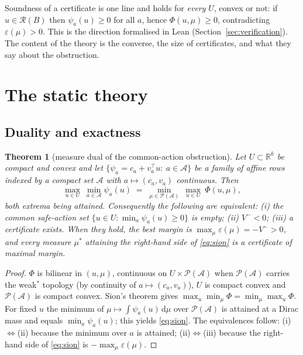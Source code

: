 \documentclass[11pt,a4paper]{article}
\theoremstyle{plain}
\newtheorem{theorem}{Theorem}[section]
\theoremstyle{definition}
\theoremstyle{remark}
\newcommand{\R}{\mathbb{R}}
\newcommand{\calA}{\mathcal{A}}
\newcommand{\calP}{\mathcal{P}}
\newcommand{\calR}{\mathcal{R}}
\newcommand{\dd}{\,\mathrm{d}}
\begin{document}
Soundness of a certificate is one line and holds for \emph{every} $U$, convex or not: if $u\in\calR(B)$ then $\psi_a(u)\ge0$ for all $a$, hence $\Phi(u,\mu)\ge0$, contradicting $\varepsilon(\mu)>0$. This is the direction formalised in Lean (Section~\ref{sec:verification}). The content of the theory is the converse, the size of certificates, and what they say about the obstruction.
\section{The static theory}\label{sec:static}

\subsection{Duality and exactness}

\begin{theorem}[measure dual of the common-action obstruction]\label{thm:dual}
Let $U\subset\R^k$ be compact and convex and let $\{\psi_a=c_a+v_a^\top u:\ a\in\calA\}$ be a family of affine rows indexed by a compact set $\calA$ with $a\mapsto(c_a,v_a)$ continuous. Then
\begin{equation}\label{eq:sion}
\max_{u\in U}\ \min_{a\in\calA}\psi_a(u)\;=\;\min_{\mu\in\calP(\calA)}\ \max_{u\in U}\ \Phi(u,\mu),
\end{equation}
both extrema being attained. Consequently the following are equivalent: (i) the common safe-action set $\{u\in U:\min_a\psi_a(u)\ge0\}$ is empty; (ii) $V^-<0$; (iii) a certificate exists. When they hold, the best margin is $\max_\mu\varepsilon(\mu)=-V^->0$, and every measure $\mu^\ast$ attaining the right-hand side of \eqref{eq:sion} is a certificate of maximal margin.
\end{theorem}

\begin{proof}
$\Phi$ is bilinear in $(u,\mu)$, continuous on $U\times\calP(\calA)$ when $\calP(\calA)$ carries the weak$^\ast$ topology (by continuity of $a\mapsto(c_a,v_a)$), $U$ is compact convex and $\calP(\calA)$ is compact convex. Sion's theorem \cite{Sion1958} gives $\max_u\min_\mu\Phi=\min_\mu\max_u\Phi$. For fixed $u$ the minimum of $\mu\mapsto\int\psi_a(u)\dd\mu$ over $\calP(\calA)$ is attained at a Dirac mass and equals $\min_a\psi_a(u)$; this yields \eqref{eq:sion}. The equivalences follow: (i)$\Leftrightarrow$(ii) because the minimum over $a$ is attained; (ii)$\Leftrightarrow$(iii) because the right-hand side of \eqref{eq:sion} is $-\max_\mu\varepsilon(\mu)$.
\end{proof}
\end{document}
